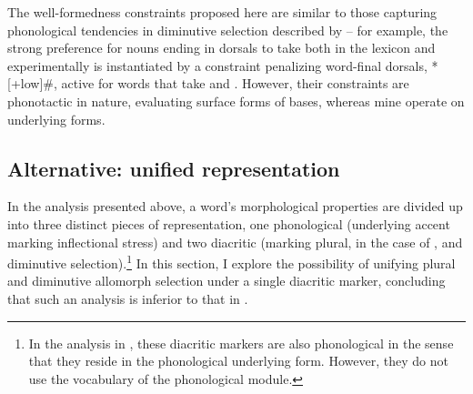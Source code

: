 \documentclass[output=paper,colorlinks,citecolor=brown
]{langscibook}
\begin{document}
The well-formedness constraints proposed here are similar to those capturing phonological tendencies in diminutive selection described by \citet{Gouskova.etal2015} -- %
for example, the strong preference for nouns ending in dorsals to take  both in the lexicon and experimentally is instantiated by a constraint penalizing word-final dorsals, *[+low]\#, active for words that take  and . However, their constraints are phonotactic in nature, evaluating surface forms of bases, whereas mine operate on underlying forms.

\subsection{Alternative: unified representation}\label{sec:alt}
In the analysis presented above, a word's morphological properties are divided up into three distinct pieces of representation, one phonological (underlying accent marking inflectional stress) and two diacritic (marking plural, in the case of \pla, and diminutive selection).\footnote{In the analysis in , these diacritic markers are also phonological in the sense that they reside in the phonological underlying form. However, they do not use the vocabulary of the phonological module.} In this section, I explore the possibility of unifying plural and diminutive allomorph selection under a single diacritic marker, concluding that such an analysis is inferior to that in .


\end{document}
